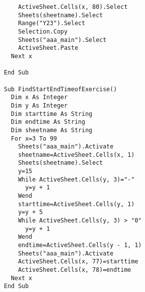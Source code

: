 \begin{lstlisting}
    ActiveSheet.Cells(x, 80).Select
    Sheets(sheetname).Select
    Range("Y23").Select
    Selection.Copy
    Sheets("aaa_main").Select
    ActiveSheet.Paste
  Next x
  
End Sub

Sub FindStartEndTimeofExercise()
  Dim x As Integer
  Dim y As Integer
  Dim starttime As String
  Dim endtime As String
  Dim sheetname As String
  For x=3 To 99
    Sheets("aaa_main").Activate
    sheetname=ActiveSheet.Cells(x, 1)
    Sheets(sheetname).Select
    y=15
    While ActiveSheet.Cells(y, 3)="-"
      y=y + 1
    Wend
    starttime=ActiveSheet.Cells(y, 1)
    y=y + 5
    While ActiveSheet.Cells(y, 3) > "0"
      y=y + 1
    Wend
    endtime=ActiveSheet.Cells(y - 1, 1)
    Sheets("aaa_main").Activate
    ActiveSheet.Cells(x, 77)=starttime
    ActiveSheet.Cells(x, 78)=endtime
  Next x
End Sub

\end{lstlisting}

